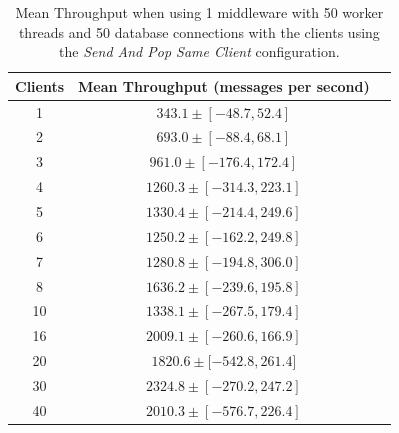 \documentclass{article}
\begin{document}
\begin{table}[H]
                    \centering
                    \begin{tabular}{|c|c|c|}
                        \hline 
                        \textbf{Clients} & \textbf{Mean Throughput} (messages per second)\\ 
                        \hline 
                        1 & $343.1 \pm  [-48.7,   52.4]$\\ 
                        \hline 
                        2 & $693.0 \pm [-88.4,   68.1]$\\ 
                        \hline 
                        3 & $961.0 \pm [-176.4,  172.4]$\\ 
                        \hline 
                        4 & $1260.3 \pm  [-314.3,    223.1]$\\ 
                        \hline 
                        5 & $1330.4 \pm  [-214.4,    249.6]$\\ 
                        \hline 
                        6 & $1250.2 \pm  [-162.2,    249.8]$\\ 
                        \hline 
                        7 & $1280.8 \pm  [-194.8,   306.0]$\\ 
                        \hline 
                        8 & $1636.2 \pm  [-239.6,  195.8]$\\ 
                        \hline 
                        10 & $1338.1  \pm [-267.5,    179.4]$\\ 
                        \hline 
                        16 & $2009.1 \pm  [-260.6,    166.9]$\\ 
                        \hline 
                        20 & $1820.6 \pm  [-542.8,    261.4$]\\ 
                        \hline 
                        30 & $2324.8 \pm  [-270.2,    247.2]$\\ 
                        \hline 
                        40 & $2010.3 \pm  [-576.7,    226.4]$\\ 
                        \hline 
                    \end{tabular}
                    \caption{Mean Throughput when using 1 middleware with 50 worker threads and 50 database connections with the clients using the \textit{Send And Pop Same Client} configuration.}
                    \label{table:throughput_1_middleware}
                \end{table} 
\end{document}
